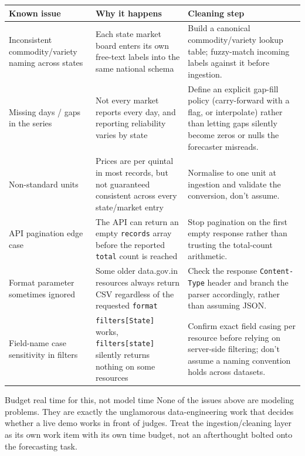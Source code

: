 \documentclass[11pt]{article}
\begin{document}
\renewcommand{\arraystretch}{1.3}
\noindent\begin{longtable}{@{}p{4.4cm}p{5.4cm}p{4.8cm}@{}}
\toprule
\textbf{Known issue} & \textbf{Why it happens} & \textbf{Cleaning step} \\
\midrule
\endhead
Inconsistent commodity/variety naming across states & Each state market board enters its own free-text
labels into the same national schema & Build a canonical commodity/variety lookup table; fuzzy-match
incoming labels against it before ingestion. \\[0.4em]
Missing days / gaps in the series & Not every market reports every day, and reporting reliability varies by
state & Define an explicit gap-fill policy (carry-forward with a flag, or interpolate) rather than letting
gaps silently become zeros or nulls the forecaster misreads. \\[0.4em]
Non-standard units & Prices are per quintal in most records, but not guaranteed consistent across every
state/market entry & Normalise to one unit at ingestion and validate the conversion, don't assume. \\[0.4em]
API pagination edge case & The API can return an empty \texttt{records} array before the reported
\texttt{total} count is reached & Stop pagination on the first empty response rather than trusting the
total-count arithmetic. \\[0.4em]
Format parameter sometimes ignored & Some older data.gov.in resources always return CSV regardless of the
requested \texttt{format} & Check the response \texttt{Content-Type} header and branch the parser
accordingly, rather than assuming JSON. \\[0.4em]
Field-name case sensitivity in filters & \texttt{filters[State]} works, \texttt{filters[state]} silently
returns nothing on some resources & Confirm exact field casing per resource before relying on server-side
filtering; don't assume a naming convention holds across datasets. \\
\bottomrule
\end{longtable}

\begin{warnbox}{Budget real time for this, not model time}
None of the issues above are modeling problems. They are exactly the unglamorous data-engineering work that
decides whether a live demo works in front of judges. Treat the ingestion/cleaning layer as its own
work item with its own time budget, not an afterthought bolted onto the forecasting task.
\end{warnbox}
\end{document}

